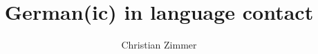 \title{German(ic) in language contact}
\author{Christian Zimmer}
\renewcommand{\lsSeries}{lv}%
\renewcommand{\lsSeriesNumber}{}

\renewcommand{\lsID}{305}
